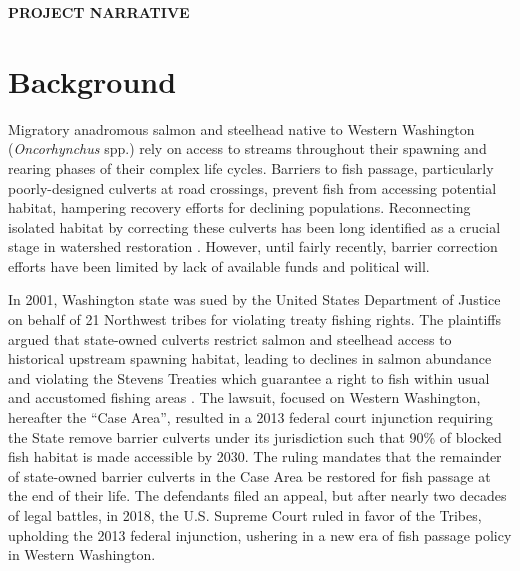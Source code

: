 \renewcommand\thesection{\Alph{section}}

\begin{center} \textbf{PROJECT NARRATIVE} \end{center}

\section{Background}


Migratory anadromous salmon and steelhead native to Western Washington (\textit{Oncorhynchus} spp.) rely on access to streams throughout their spawning and rearing phases of their complex life cycles. Barriers to fish passage, particularly poorly-designed culverts at road crossings, prevent fish from accessing potential habitat, hampering recovery efforts for declining populations. Reconnecting isolated habitat by correcting these culverts has been long identified as a crucial stage in watershed restoration \citep{roni_review_2002}. However, until fairly recently, barrier correction efforts have been limited by lack of available funds and political will. 

In 2001, Washington state was sued by the United States Department of Justice on behalf of 21 Northwest tribes for violating treaty fishing rights. The plaintiffs argued that state-owned culverts restrict salmon and steelhead access to historical upstream spawning habitat, leading to declines in salmon abundance and violating the Stevens Treaties which guarantee a right to fish within usual and accustomed fishing areas \citep{hickey_highway_2018}. The lawsuit, focused on Western Washington, hereafter the ``Case Area'', resulted in a 2013 federal court injunction requiring the State remove barrier culverts under its jurisdiction such that 90\% of blocked fish habitat is made accessible by 2030. The ruling mandates that the remainder of state-owned barrier culverts in the Case Area be restored for fish passage at the end of their life. The defendants filed an appeal, but after nearly two decades of legal battles, in 2018, the U.S. Supreme Court ruled in favor of the Tribes, upholding the 2013 federal injunction, ushering in a new era of fish passage policy in Western Washington. 


